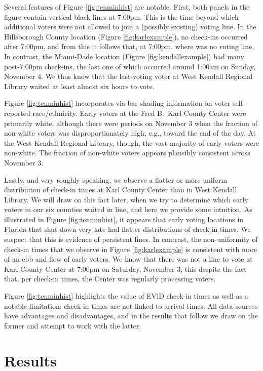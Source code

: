 \documentclass[12pt,titlepage]{article}
\begin{document}
Several features of Figure \ref{fig:tenminhist} are notable.  First,
both panels in the figure contain vertical black lines at 7:00pm.
This is the time beyond which additional voters were not allowed to
join a (possibly existing) voting line.  In the Hillsborough County
location (Figure \ref{fig:karlexample}), no check-ins occurred after
7:00pm, and from this it follows that, at 7:00pm, where was no voting
line.  In contrast, the Miami-Dade location (Figure
\ref{fig:kendallexample}) had many post-7:00pm check-ins, the last one
of which occurred around 1:00am on Sunday, November 4.  We thus know
that the last-voting voter at West Kendall Regional Library waited at
least almost six hours to vote.

Figure \ref{fig:tenminhist} incorporates via bar shading information
on voter self-reported race/ethnicity.  Early voters at the Fred B.\
Karl County Center were primarily white, although there were periods
on November 3 when the fraction of non-white voters was
disproportionately high, e.g., toward the end of the day.  At the West
Kendall Regional Library, though, the vast majority of early voters
were non-white.  The fraction of non-white voters appears plausibly
consistent across November 3.

Lastly, and very roughly speaking, we observe a flatter or
more-uniform distribution of check-in times at Karl County Center than
in West Kendall Library.  We will draw on this fact later, when we try
to determine which early voters in our six counties waited in line,
and here we provide some intuition.  As illustrated in Figure
\ref{fig:tenminhist}, it appears that early voting locations in
Florida that shut down very late had flatter distributions of check-in
times.  We suspect that this is evidence of persistent lines.  In
contrast, the non-uniformity of check-in times that we observe in
Figure \ref{fig:karlexample} is consistent with more of an ebb and
flow of early voters.  We know that there was not a line to vote at
Karl County Center at 7:00pm on Saturday, November 3, this despite the
fact that, per check-in times, the Center was regularly processing
voters.

Figure \ref{fig:tenminhist} highlights the value of EViD check-in
times as well as a notable limitation: check-in times are not linked
to arrival times.  All data sources have advantages and disadvantages,
and in the results that follow we draw on the former and attempt to
work with the latter.

\section*{Results}
\end{document}
